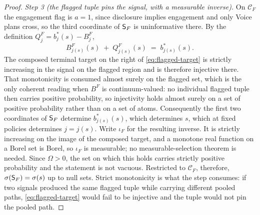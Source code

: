 \begin{proof}
\emph{Step 3 (the flagged tuple pins the signal, with a measurable inverse).} On $\mathcal C_F$ the
engagement flag is $a=1$, since disclosure implies engagement and only Voice plans cross, so the
third coordinate of $\mathsf{S}_F$ is uninformative there. By the definition $Q_j^F=b_j^*(s)-B_j^F$,
\begin{equation}
\label{eq:flagged-target}
B^F_{j(s)}(s) \;+\; Q^F_{j(s)}(s) \;=\; b^*_{j(s)}(s).
\end{equation}
The composed terminal target on the right of \eqref{eq:flagged-target} is strictly increasing in the
signal on the flagged region and is therefore injective there. That monotonicity is consumed almost
surely on the flagged set, which is the only coherent reading when $B^F$ is continuum-valued: no
individual flagged tuple then carries positive probability, so injectivity holds almost surely on a
set of positive probability rather than on a set of atoms. Consequently the first two coordinates of
$\mathsf{S}_F$ determine $b^*_{j(s)}(s)$, which determines $s$, which at fixed policies determines $j=j(s)$.
Write $\iota_F$ for the resulting inverse. It is strictly increasing on the image of the composed
target, and a monotone real function on a Borel set is Borel, so $\iota_F$ is measurable; no
measurable-selection theorem is needed. Since $\Omega>0$, the set on which this holds carries
strictly positive probability and the statement is not vacuous. Restricted to $\mathcal C_F$,
therefore, $\sigma(\mathsf{S}_F)=\sigma(s)$ up to null sets. Strict monotonicity is what the step consumes:
if two signals produced the same flagged tuple while carrying different pooled paths,
\eqref{eq:flagged-target} would fail to be injective and the tuple would not pin the pooled path.


\end{proof}
